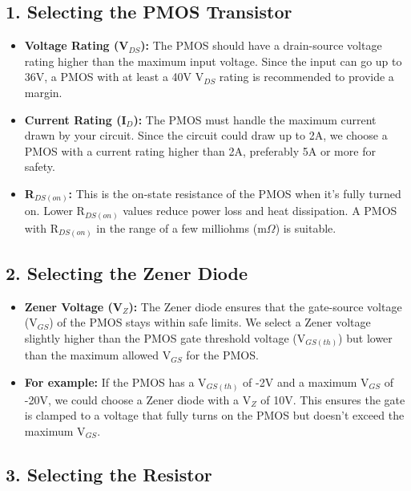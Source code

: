 \documentclass{article}
\begin{document}
\subsection*{1. Selecting the PMOS Transistor}

\begin{itemize}
    \item \textbf{Voltage Rating (V\(_{DS}\)):} The PMOS should have a drain-source voltage rating higher than the maximum input voltage. Since the input can go up to 36V, a PMOS with at least a 40V V\(_{DS}\) rating is recommended to provide a margin.
    
    \item \textbf{Current Rating (I\(_{D}\)):} The PMOS must handle the maximum current drawn by your circuit. Since the circuit could draw up to 2A, we choose a PMOS with a current rating higher than 2A, preferably 5A or more for safety.
    
    \item \textbf{R\(_{DS(on)}\):} This is the on-state resistance of the PMOS when it's fully turned on. Lower R\(_{DS(on)}\) values reduce power loss and heat dissipation. A PMOS with R\(_{DS(on)}\) in the range of a few milliohms (m\(\Omega\)) is suitable.
\end{itemize}

\subsection*{2. Selecting the Zener Diode}

\begin{itemize}
    \item \textbf{Zener Voltage (V\(_Z\)):} The Zener diode ensures that the gate-source voltage (V\(_{GS}\)) of the PMOS stays within safe limits. We select a Zener voltage slightly higher than the PMOS gate threshold voltage (V\(_{GS(th)}\)) but lower than the maximum allowed V\(_{GS}\) for the PMOS.
    
    \item \textbf{For example:} If the PMOS has a V\(_{GS(th)}\) of -2V and a maximum V\(_{GS}\) of -20V, we could choose a Zener diode with a V\(_Z\) of 10V. This ensures the gate is clamped to a voltage that fully turns on the PMOS but doesn’t exceed the maximum V\(_{GS}\).
\end{itemize}

\subsection*{3. Selecting the Resistor}
\end{document}
